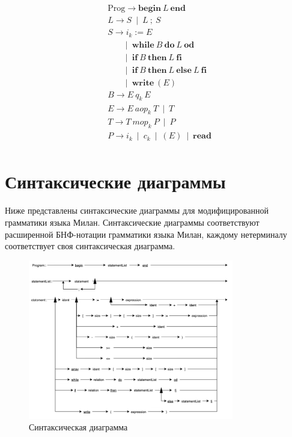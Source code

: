 \documentclass[areasetadvanced]{scrartcl}
\begin{document}
\[
\begin{aligned}
&\text{Prog} \rightarrow \textbf{begin}\ L\ \textbf{end} \\
&L \rightarrow S\ \mid\ L\ ;\ S \\
&S \rightarrow i_k := E \\
&\quad\;\;\;\mid\ \textbf{while}\ B\ \textbf{do}\ L\ \textbf{od} \\
&\quad\;\;\;\mid\ \textbf{if}\ B\ \textbf{then}\ L\ \textbf{fi} \\
&\quad\;\;\;\mid\ \textbf{if}\ B\ \textbf{then}\ L\ \textbf{else}\ L\ \textbf{fi} \\
&\quad\;\;\;\mid\ \textbf{write}\ (E) \\
&B \rightarrow E\ q_k\ E \\
&E \rightarrow E\ aop_k\ T\ \mid\ T \\
&T \rightarrow T\ mop_k\ P\ \mid\ P \\
&P \rightarrow i_k\ \mid\ c_k\ \mid\ (E)\ \mid\ \textbf{read} \\
\end{aligned}
\]

    \section{Синтаксические диаграммы}
    Ниже представлены синтаксические диаграммы для модифицированной грамматики языка Милан. Синтаксические диаграммы соответствуют расширенной БНФ-нотации грамматики языка Милан, каждому нетерминалу соответствует своя синтаксическая диаграмма. 

    \begin{figure}[H]
        \centering
        \includegraphics[width=0.8\textwidth]{beginEnd.png}
        \caption{Синтаксическая диаграмма}
    \end{figure}
\end{document}
